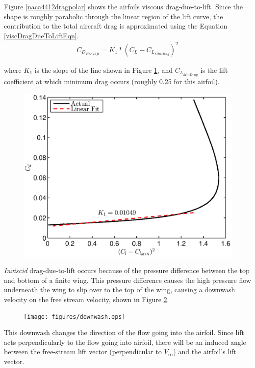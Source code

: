 Figure \ref{naca4412dragpolar} shows the airfoils viscous drag-due-to-lift. Since the shape is roughly parabolic through the linear region of the lift curve, the contribution to the total aircraft drag is approximated using the Equation \ref{viscDragDueToLiftEqn}\cite{nicolaiWhitePaper}.
\begin{align}
\label{viscDragDueToLiftEqn}
C_{D_{Visc. Lift}} = K_1 * (C_L - C_{L_{Min Drag}})^2
\end{align}

where $K_1$ is the slope of the line shown in Figure \ref{naca4412cdmin}, and $C_{L_{MinDrag}}$ is the lift coefficient at which minimum drag occurs (roughly 0.25 for this airfoil).

\begin{figure}[h!]
  \centering
  \includegraphics[width=.6\linewidth]{figures/naca4412cdmin.eps}
  \label{naca4412cdmin}
\end{figure}
\textit{Inviscid} drag-due-to-lift occurs because of the pressure difference between the top and bottom of a finite wing. This pressure difference causes the high pressure flow underneath the wing to slip over to the top of the wing, causing a downwash velocity on the free stream velocity, shown in Figure \ref{downwash}.
\begin{figure}[H]
  \centering
  \texttt{[image: figures/downwash.eps]}
  \label{downwash}
\end{figure}

This downwash changes the direction of the flow going into the airfoil. Since lift acts perpendicularly to the flow going into airfoil, there will be an induced angle between the free-stream lift vector (perpendicular to $V_\infty$) and the airfoil's lift vector.

